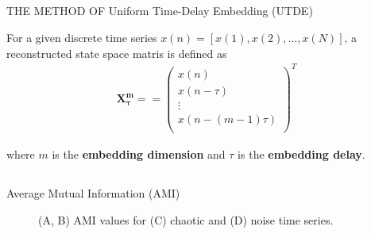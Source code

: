 \subsection{}
{

\begin{frame}{THE METHOD OF Uniform Time-Delay Embedding (UTDE)}

For a given discrete time series $x(n) = [x(1) , x(2), \dots, x(N)]$,
a reconstructed state space matris is defined as 
\begin{eqnarray*}
 \mathbf{X^{m}_{\tau}}
=
    = \begin{pmatrix} \nonumber
      x(n)  \\
      x(n-\tau) \\
      \vdots  \\
      x(n-(m-1)\tau) \\
      \end{pmatrix}^T
\end{eqnarray*}


where $m$ is the \textbf{ embedding dimension}  and  $\tau$ is the \textbf{ embedding delay}.




\end{frame}
}


\subsection{}
{

\begin{frame}{Average Mutual Information (AMI)}
    \begin{figure}
        \centering
	\caption{(A, B) AMI values for (C) chaotic and (D) noise time series.} 
   \end{figure}
	
\end{frame}
}


